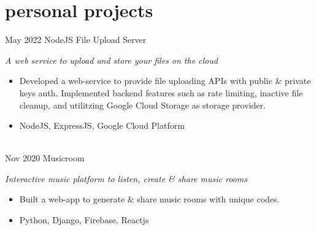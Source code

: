 \section*{personal projects}
\begin{entrylist}
	\entry
	{May 2022}
	{NodeJS File Upload Server}{}
	{\emph{A web service to upload and store your files on the cloud}
	\begin{itemize}
		\item Developed a web-service to provide file uploading APIs with public \& private keys auth. Implemented backend features such as rate limiting, inactive file cleanup, and utilitzing Google Cloud Storage as storage provider.
		\item NodeJS, ExpressJS, Google Cloud Platform
	\end{itemize}
	}
	\ \\
	\entry
	{Nov 2020}
	{Musicroom}{}
	{\emph{Interactive music platform to listen, create \& share music rooms}
		\begin{itemize}
			\item Built a web-app to generate \& share music rooms with unique codes. 
			\item Python, Django, Firebase, Reactjs
		\end{itemize}
	}
	\ \\
\end{entrylist}


